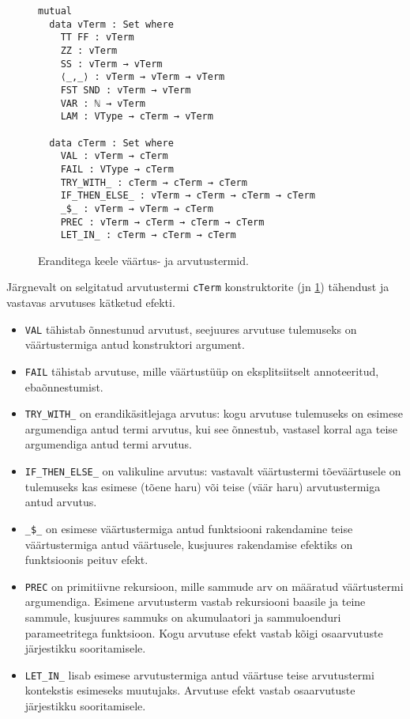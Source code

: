 \documentclass[a4paper,12pt]{article}
\begin{document}
\begin{figure}
  \begin{verbatim}
mutual
  data vTerm : Set where
    TT FF : vTerm
    ZZ : vTerm
    SS : vTerm → vTerm
    ⟨_,_⟩ : vTerm → vTerm → vTerm
    FST SND : vTerm → vTerm
    VAR : ℕ → vTerm
    LAM : VType → cTerm → vTerm

  data cTerm : Set where
    VAL : vTerm → cTerm
    FAIL : VType → cTerm
    TRY_WITH_ : cTerm → cTerm → cTerm
    IF_THEN_ELSE_ : vTerm → cTerm → cTerm → cTerm
    _$_ : vTerm → vTerm → cTerm
    PREC : vTerm → cTerm → cTerm → cTerm
    LET_IN_ : cTerm → cTerm → cTerm\end{verbatim}
  \caption{Eranditega keele väärtus- ja arvutustermid.}
  \label{fig:exc.raw}
\end{figure}

Järgnevalt on selgitatud arvutustermi {\tt cTerm} konstruktorite (jn \ref{fig:exc.raw}) tähendust ja vastavas arvutuses kätketud efekti.
\begin{itemize}
  \item {\tt VAL} tähistab õnnestunud arvutust, seejuures arvutuse tulemuseks on väärtustermiga antud konstruktori argument.
  \item {\tt FAIL} tähistab arvutuse, mille väärtustüüp on eksplitsiitselt annoteeritud, ebaõnnestumist.
  \item {\tt TRY_WITH_} on erandikäsitlejaga arvutus: kogu arvutuse tulemuseks on esimese argumendiga antud termi arvutus, kui see õnnestub, vastasel korral aga teise argumendiga antud termi arvutus.
  \item {\tt IF_THEN_ELSE_} on valikuline arvutus: vastavalt väärtustermi tõeväärtusele on tulemuseks kas esimese (tõene haru) või teise (väär haru) arvutustermiga antud arvutus.
  \item {\tt _\$_} on esimese väärtustermiga antud funktsiooni rakendamine teise väärtustermiga antud väärtusele, kusjuures rakendamise efektiks on funktsioonis peituv efekt.
  \item {\tt PREC} on primitiivne rekursioon, mille sammude arv on määratud väärtustermi argumendiga. Esimene arvutusterm vastab rekursiooni baasile ja teine sammule, kusjuures sammuks on akumulaatori ja sammuloenduri parameetritega funktsioon. Kogu arvutuse efekt vastab kõigi osaarvutuste järjestikku sooritamisele.
  \item {\tt LET_IN_} lisab esimese arvutustermiga antud väärtuse teise arvutustermi kontekstis esimeseks muutujaks. Arvutuse efekt vastab osaarvutuste järjestikku sooritamisele.
\end{itemize}
\end{document}
